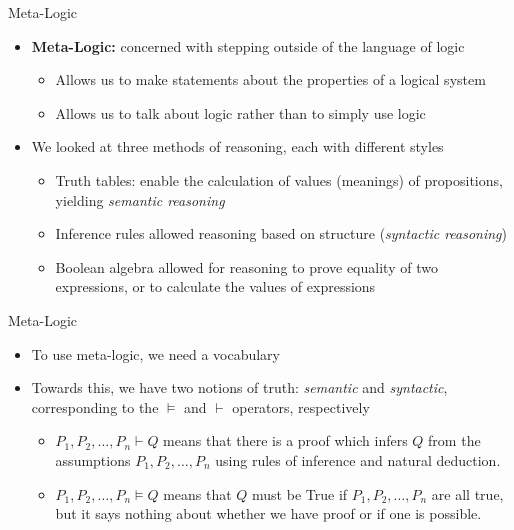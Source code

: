 \documentclass[11pt,t,pdf,xcolor=svgnames,aspectratio=169]{beamer}
\providecommand{\tightlist}{%
  \setlength{\itemsep}{5pt}\setlength{\parskip}{0pt}}
\begin{document}
\begin{frame}{Meta-Logic}
\protect\hypertarget{meta-logic}{}
\begin{itemize}
\tightlist
\item
  \textbf{Meta-Logic:} concerned with stepping outside of the language
  of logic

  \begin{itemize}
  \tightlist
  \item
    Allows us to make statements about the properties of a logical
    system
  \item
    Allows us to talk about logic rather than to simply use logic
  \end{itemize}
\item
  We looked at three methods of reasoning, each with different styles

  \begin{itemize}
  \tightlist
  \item
    Truth tables: enable the calculation of values (meanings) of
    propositions, yielding \emph{semantic reasoning}
  \item
    Inference rules allowed reasoning based on structure
    (\emph{syntactic reasoning})
  \item
    Boolean algebra allowed for reasoning to prove equality of two
    expressions, or to calculate the values of expressions
  \end{itemize}
\end{itemize}
\end{frame}

\begin{frame}{Meta-Logic}
\protect\hypertarget{meta-logic-1}{}
\begin{itemize}
\item
  To use meta-logic, we need a vocabulary
\item
  Towards this, we have two notions of truth: \emph{semantic} and
  \emph{syntactic}, corresponding to the \(\vDash\) and \(\vdash\)
  operators, respectively

  \begin{itemize}
  \tightlist
  \item
    \(P_1, P_2, \ldots, P_n \vdash Q\) means that there is a proof which
    infers \(Q\) from the assumptions \(P_1,P_2,\ldots,P_n\) using rules
    of inference and natural deduction.
  \item
    \(P_1,P_2,\ldots,P_n \vDash Q\) means that \(Q\) must be True if
    \(P_1,P_2,\ldots,P_n\) are all true, but it says nothing about
    whether we have proof or if one is possible.
  \end{itemize}
\end{itemize}
\end{frame}
\end{document}
